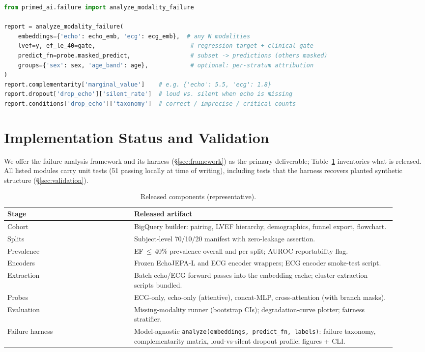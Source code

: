 \documentclass{article}
\begin{document}
\begin{lstlisting}[language=Python,caption={Using the harness: any $N$ modalities, any mask-aware probe.},label=lst:api]
from primed_ai.failure import analyze_modality_failure

report = analyze_modality_failure(
    embeddings={'echo': echo_emb, 'ecg': ecg_emb},  # any N modalities
    lvef=y, ef_le_40=gate,                           # regression target + clinical gate
    predict_fn=probe.masked_predict,                 # subset -> predictions (others masked)
    groups={'sex': sex, 'age_band': age},            # optional: per-stratum attribution
)
report.complementarity['marginal_value']    # e.g. {'echo': 5.5, 'ecg': 1.8}
report.dropout['drop_echo']['silent_rate']  # loud vs. silent when echo is missing
report.conditions['drop_echo']['taxonomy']  # correct / imprecise / critical counts
\end{lstlisting}



\section{Implementation Status and Validation}
\label{sec:status}
We offer the failure-analysis framework and its harness (\S\ref{sec:framework}) as the primary
deliverable; Table~\ref{tab:release} inventories what is released. All listed modules carry unit
tests (51 passing locally at time of writing), including tests that the harness recovers planted
synthetic structure (\S\ref{sec:validation}).

\begin{table}[t]
\centering
\caption{Released components (representative).}
\label{tab:release}
\footnotesize
\begin{tabular}{@{}p{0.30\linewidth}p{0.62\linewidth}@{}}
\toprule
\textbf{Stage} & \textbf{Released artifact} \\
\midrule
Cohort &
BigQuery builder: pairing, LVEF hierarchy, demographics, funnel export, flowchart. \\
Splits &
Subject-level 70/10/20 manifest with zero-leakage assertion. \\
Prevalence &
\mbox{EF\,$\leq$\,40\%} prevalence overall and per split; AUROC reportability flag. \\
Encoders &
Frozen EchoJEPA-L and ECG encoder wrappers; ECG encoder smoke-test script. \\
Extraction &
Batch echo/ECG forward passes into the embedding cache; cluster extraction scripts bundled. \\
Probes &
ECG-only, echo-only (attentive), concat-MLP, cross-attention (with branch masks). \\
Evaluation &
Missing-modality runner (bootstrap CIs); degradation-curve plotter; fairness stratifier. \\
Failure harness &
Model-agnostic \texttt{analyze(embeddings, predict\_fn, labels)}: failure taxonomy, complementarity matrix, loud-vs-silent dropout profile; figures + CLI. \\
\bottomrule
\end{tabular}
\end{table}
\end{document}
